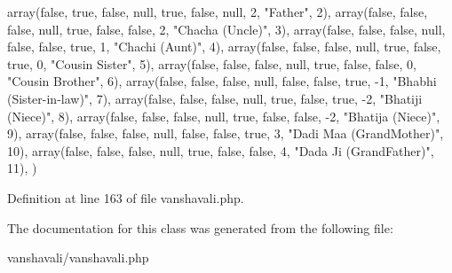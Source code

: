 \begin{DoxyCode}
        array(\textcolor{keyword}{false}, \textcolor{keyword}{true}, \textcolor{keyword}{false}, null, \textcolor{keyword}{true}, \textcolor{keyword}{false}, null, 2, \textcolor{stringliteral}{"Father"}, 2),
        array(\textcolor{keyword}{false}, \textcolor{keyword}{false}, \textcolor{keyword}{false}, null, \textcolor{keyword}{true}, \textcolor{keyword}{false}, \textcolor{keyword}{false}, 2, \textcolor{stringliteral}{"Chacha (Uncle)"}, 3),
        array(\textcolor{keyword}{false}, \textcolor{keyword}{false}, \textcolor{keyword}{false}, null, \textcolor{keyword}{false}, \textcolor{keyword}{false}, \textcolor{keyword}{true}, 1, \textcolor{stringliteral}{"Chachi (Aunt)"}, 4),
        array(\textcolor{keyword}{false}, \textcolor{keyword}{false}, \textcolor{keyword}{false}, null, \textcolor{keyword}{true}, \textcolor{keyword}{false}, \textcolor{keyword}{true}, 0, \textcolor{stringliteral}{"Cousin Sister"}, 5),
        array(\textcolor{keyword}{false}, \textcolor{keyword}{false}, \textcolor{keyword}{false}, null, \textcolor{keyword}{true}, \textcolor{keyword}{false}, \textcolor{keyword}{false}, 0, \textcolor{stringliteral}{"Cousin Brother"}, 6),
        array(\textcolor{keyword}{false}, \textcolor{keyword}{false}, \textcolor{keyword}{false}, null, \textcolor{keyword}{false}, \textcolor{keyword}{false}, \textcolor{keyword}{true}, -1, \textcolor{stringliteral}{"Bhabhi (Sister-in-law)"}, 7),
        array(\textcolor{keyword}{false}, \textcolor{keyword}{false}, \textcolor{keyword}{false}, null, \textcolor{keyword}{true}, \textcolor{keyword}{false}, \textcolor{keyword}{true}, -2, \textcolor{stringliteral}{"Bhatiji (Niece)"}, 8),
        array(\textcolor{keyword}{false}, \textcolor{keyword}{false}, \textcolor{keyword}{false}, null, \textcolor{keyword}{true}, \textcolor{keyword}{false}, \textcolor{keyword}{false}, -2, \textcolor{stringliteral}{"Bhatija (Niece)"}, 9),
        array(\textcolor{keyword}{false}, \textcolor{keyword}{false}, \textcolor{keyword}{false}, null, \textcolor{keyword}{false}, \textcolor{keyword}{false}, \textcolor{keyword}{true}, 3, \textcolor{stringliteral}{"Dadi Maa (GrandMother)"}, 10),
        array(\textcolor{keyword}{false}, \textcolor{keyword}{false}, \textcolor{keyword}{false}, null, \textcolor{keyword}{true}, \textcolor{keyword}{false}, \textcolor{keyword}{false}, 4, \textcolor{stringliteral}{"Dada Ji (GrandFather)"}, 11),
    )
\end{DoxyCode}


Definition at line 163 of file vanshavali.\-php.



The documentation for this class was generated from the following file\-:\begin{DoxyCompactItemize}
\item 
vanshavali/vanshavali.\-php\end{DoxyCompactItemize}
